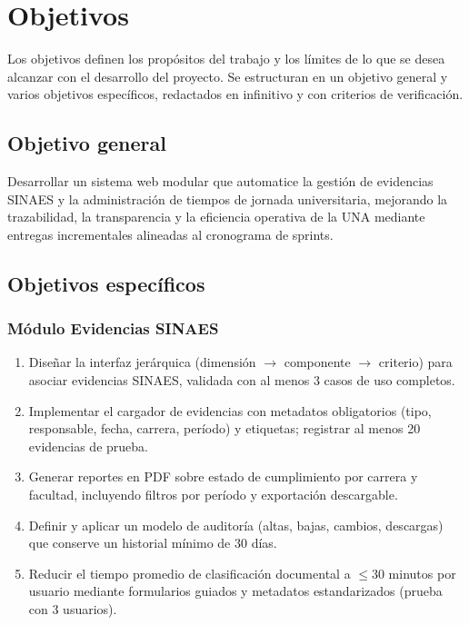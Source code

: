 \chapter{Objetivos}

Los objetivos definen los propósitos del trabajo y los límites de lo que se desea alcanzar con el desarrollo del proyecto. Se estructuran en un objetivo general y varios objetivos específicos, redactados en infinitivo y con criterios de verificación.

\section{Objetivo general}
Desarrollar un sistema web modular que automatice la gestión de evidencias SINAES y la administración de tiempos de jornada universitaria, mejorando la trazabilidad, la transparencia y la eficiencia operativa de la UNA mediante entregas incrementales alineadas al cronograma de sprints.

\section{Objetivos específicos}

\subsection*{Módulo Evidencias SINAES}
\begin{enumerate}
  \item Diseñar la interfaz jerárquica (dimensión $\rightarrow$ componente $\rightarrow$ criterio) para asociar evidencias SINAES, validada con al menos 3 casos de uso completos.
  \item Implementar el cargador de evidencias con metadatos obligatorios (tipo, responsable, fecha, carrera, período) y etiquetas; registrar al menos 20 evidencias de prueba.
  \item Generar reportes en PDF sobre estado de cumplimiento por carrera y facultad, incluyendo filtros por período y exportación descargable.
  \item Definir y aplicar un modelo de auditoría (altas, bajas, cambios, descargas) que conserve un historial mínimo de 30 días.
  \item Reducir el tiempo promedio de clasificación documental a \(\leq 30\) minutos por usuario mediante formularios guiados y metadatos estandarizados (prueba con 3 usuarios).
\end{enumerate}

